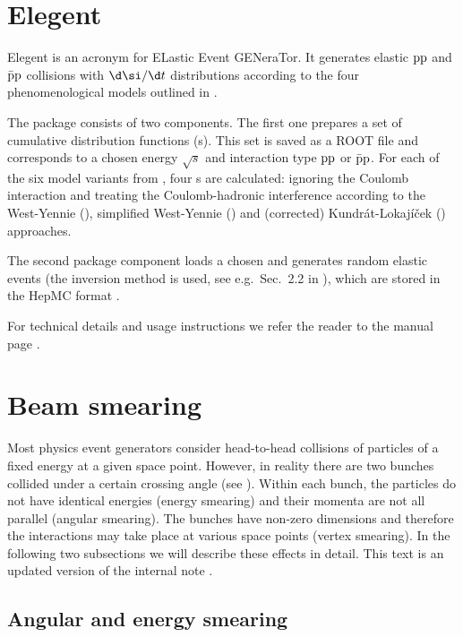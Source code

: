 

\section[elegent]{Elegent}

Elegent is an acronym for ELastic Event GENeraTor. It generates elastic $\rm pp$ and $\rm\bar pp$ collisions with $\d\si/\d t$ distributions according to the four phenomenological models outlined in .

The package consists of two components. The first one prepares a set of cumulative distribution functions (s). This set is saved as a ROOT file and corresponds to a chosen energy $\sqrt s$ and interaction type $\rm pp$ or $\rm \bar pp$. For each of the six model variants from , four s are calculated: ignoring the Coulomb interaction and treating the Coulomb-hadronic interference according to the West-Yennie (), simplified West-Yennie () and (corrected) Kundr\' at-Lokaj\' i\v cek () approaches.

The second package component loads a chosen  and generates random elastic events (the inversion method is used, see e.g.~Sec.~2.2 in ), which are stored in the HepMC format .

For technical details and usage instructions we refer the reader to the manual page .



\section[beam smearing]{Beam smearing}

Most physics event generators consider head-to-head collisions of particles of a fixed energy at a given space point. However, in reality there are two bunches collided under a certain crossing angle (see ). Within each bunch, the particles do not have identical energies (energy smearing) and their momenta are not all parallel (angular smearing). The bunches have non-zero dimensions and therefore the interactions may take place at various space points (vertex smearing). In the following two subsections we will describe these effects in detail. This text is an updated version of the internal note .


\subsection{Angular and energy smearing}

